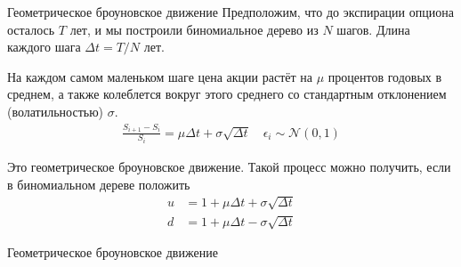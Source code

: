 \documentclass{beamer}
\begin{document}
\begin{frame}{Геометрическое броуновское движение}
\justify
Предположим, что до экспирации опциона осталось $T$ лет, и мы построили биномиальное дерево из $N$ шагов. Длина каждого шага $\Delta t = T/N$ лет.

\justify
На каждом самом маленьком шаге цена акции растёт на $\mu$ процентов годовых в среднем, а также колеблется вокруг этого среднего со стандартным отклонением (волатильностью) $\sigma$.
\begin{align*}
\frac{S_{i+1} - S_i}{S_i} = \mu \Delta t + \sigma \sqrt{\Delta t} \quad \epsilon_i \sim \mathcal{N}(0, 1)
\end{align*}

\justify
Это геометрическое броуновское движение. Такой процесс можно получить, если в биномиальном дереве положить
\begin{align*}
u &= 1 + \mu \Delta t + \sigma\sqrt{\Delta t} \\
d &= 1 + \mu \Delta t - \sigma\sqrt{\Delta t}
\end{align*}
\end{frame}



\newcommand{\plotBrownianMotion}[2] {
	
	\addplot[
		color = #2,
		mark = none,
		thick
	]
	table[
		x=t,
		y=s,
		col sep=comma
	]
	{#1};
	
	\addplot[
		color = #2,
		mark = none,
		thick,
		dashed,
		forget plot
	]
	table[
		x=t,
		y=trend,
		col sep=comma
	]
	{#1};
}



\begin{frame}{Геометрическое броуновское движение}
\centering
{}
\end{frame}
\end{document}
